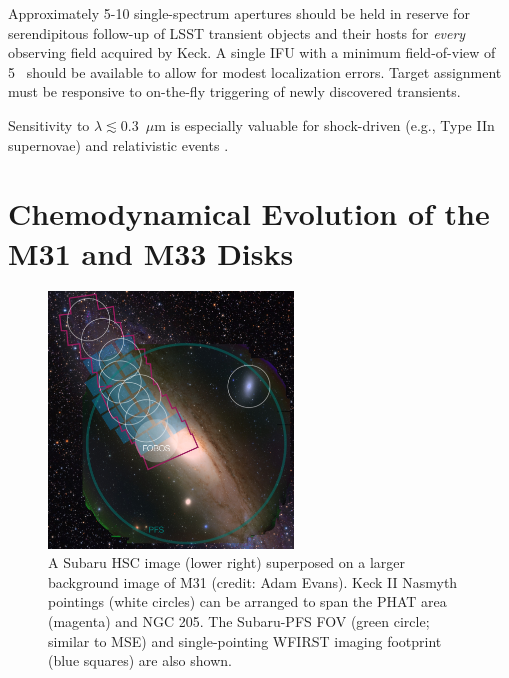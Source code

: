 \documentclass[11pt,a4paper,twoside,onecolumn,openany,final,oldfontcommands]{memoir}
\begin{document}
\begin{programrequirement}
\reqitem Approximately 5-10 single-spectrum apertures should be held in reserve for serendipitous follow-up of LSST transient objects and their hosts for \textit{every} observing field acquired by Keck.
\reqitem A single IFU with a minimum field-of-view of 5\arcsec\  should be available to allow for modest localization errors.
\reqitem Target assignment must be responsive to on-the-fly triggering of newly discovered transients.
\end{programrequirement}

\begin{sciencerequirement}
\reqitem Sensitivity to $\lambda \lesssim 0.3$~$\mu$m is  especially valuable for shock-driven (e.g., Type IIn supernovae) and relativistic events \citep[e.g., the atypically bright Type Ib supernova AT 2018cow;][]{margutti2019}.
\end{sciencerequirement}




\section{Chemodynamical Evolution of the M31 and M33 Disks}
\label{sec:m31disk}

\begin{figure}
\begin{center}
\includegraphics[width=0.58\textwidth]{figs/M31_footprint_v3.jpg}
\end{center}
\caption[M31 pointing distribution]{A Subaru HSC image (lower right) superposed on a larger background image of M31 (credit: Adam Evans).  Keck II Nasmyth pointings (white circles) can be arranged to span the PHAT area (magenta) and NGC 205.  The Subaru-PFS FOV (green circle; similar to MSE) and single-pointing WFIRST imaging footprint (blue squares) are also shown.}
\label{fig:M31}    
\end{figure}
\end{document}
